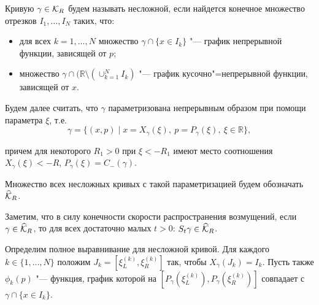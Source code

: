 \begin{definition}[11]Кривую $\gamma\in{\cal K}_R$ будем называть несложной, если найдется конечное множество отрезков $I_1,\dots,I_N$ таких, что:

\begin{itemize}

\item[1)] для всех $k=1,\dots,N$ множество $\gamma\cap\{x\in I_k\}$ "--- график непрерывной функции, зависящей от $p$;

\item[2)] множество $\gamma\cap(\mathbb{R}\setminus(\cup _{k=1}^NI_k)$ "--- график кусочно"=непрерывной функции, зависящей от $x$.



\end{itemize}

\end{definition}



\smallskip



Будем далее считать, что $\gamma$ параметризована непрерывным образом при помощи параметра $\xi$, т.е. $$\gamma=\{(x,p)\mid x=X_{\gamma}(\xi),~p=P_{\gamma}(\xi),~\xi\in\mathbb{R}\},$$ 

причем для некоторого $R_1>0$ при $\xi<-R_1$ имеют место соотношения $X_{\gamma}(\xi)<-R$, $P_{\gamma}(\xi)=C_-(\gamma)$. 

Множество всех несложных кривых с такой параметризацией будем обозначать $\widehat{\cal K}_R$. 

Заметим, что в силу конечности скорости распространения возмущений, если $\gamma\in\widehat{\cal K}_R$, то для всех достаточно малых $t>0$: $S_t\gamma\in\widehat{\cal K}_R$. 



Определим полное выравнивание для несложной кривой. Для каждого $k\in\{1,\dots,N\}$ положим $J_k=[\xi_L^{(k)},\xi_R^{(k)}]$ так, чтобы $X_{\gamma}(J_k)=I_k$. Пусть также $\phi_k(p)$ "--- функция, график которой на $[P_{\gamma}(\xi_L^{(k)}),P_{\gamma}(\xi_R^{(k)})]$ совпадает с ${\gamma\cap\{x\in I_k\}}$.



\smallskip



\hypertarget{palin:definition11}{}



